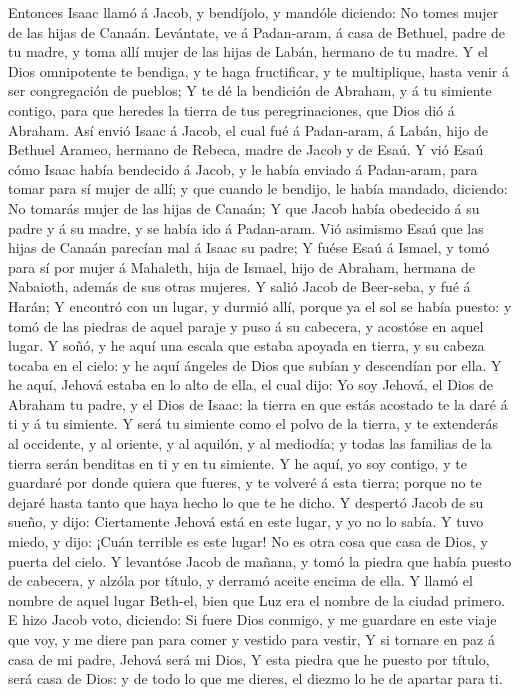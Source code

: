  Entonces Isaac llamó á Jacob, y bendíjolo, y mandóle
diciendo: No tomes mujer de las hijas de Canaán.  Levántate,
ve á Padan-aram, á casa de Bethuel, padre de tu madre, y toma allí mujer
de las hijas de Labán, hermano de tu madre.  Y el Dios
omnipotente te bendiga, y te haga fructificar, y te multiplique, hasta
venir á ser congregación de pueblos;  Y te dé la bendición
de Abraham, y á tu simiente contigo, para que heredes la tierra de tus
peregrinaciones, que Dios dió á Abraham.  Así envió Isaac á
Jacob, el cual fué á Padan-aram, á Labán, hijo de Bethuel Arameo,
hermano de Rebeca, madre de Jacob y de Esaú.  Y vió Esaú
cómo Isaac había bendecido á Jacob, y le había enviado á Padan-aram,
para tomar para sí mujer de allí; y que cuando le bendijo, le había
mandado, diciendo: No tomarás mujer de las hijas de Canaán; 
Y que Jacob había obedecido á su padre y á su madre, y se había ido á
Padan-aram.  Vió asimismo Esaú que las hijas de Canaán
parecían mal á Isaac su padre;  Y fuése Esaú á Ismael, y
tomó para sí por mujer á Mahaleth, hija de Ismael, hijo de Abraham,
hermana de Nabaioth, además de sus otras mujeres.  Y salió
Jacob de Beer-seba, y fué á Harán;  Y encontró con un
lugar, y durmió allí, porque ya el sol se había puesto: y tomó de las
piedras de aquel paraje y puso á su cabecera, y acostóse en aquel lugar.
 Y soñó, y he aquí una escala que estaba apoyada en tierra,
y su cabeza tocaba en el cielo: y he aquí ángeles de Dios que subían y
descendían por ella.  Y he aquí, Jehová estaba en lo alto
de ella, el cual dijo: Yo soy Jehová, el Dios de Abraham tu padre, y el
Dios de Isaac: la tierra en que estás acostado te la daré á ti y á tu
simiente.  Y será tu simiente como el polvo de la tierra, y
te extenderás al occidente, y al oriente, y al aquilón, y al mediodía; y
todas las familias de la tierra serán benditas en ti y en tu simiente.
 Y he aquí, yo soy contigo, y te guardaré por donde quiera
que fueres, y te volveré á esta tierra; porque no te dejaré hasta tanto
que haya hecho lo que te he dicho.  Y despertó Jacob de su
sueño, y dijo: Ciertamente Jehová está en este lugar, y yo no lo sabía.
 Y tuvo miedo, y dijo: ¡Cuán terrible es este lugar! No es
otra cosa que casa de Dios, y puerta del cielo.  Y
levantóse Jacob de mañana, y tomó la piedra que había puesto de
cabecera, y alzóla por título, y derramó aceite encima de ella.
 Y llamó el nombre de aquel lugar Beth-el, bien que Luz era
el nombre de la ciudad primero.  E hizo Jacob voto,
diciendo: Si fuere Dios conmigo, y me guardare en este viaje que voy, y
me diere pan para comer y vestido para vestir,  Y si
tornare en paz á casa de mi padre, Jehová será mi Dios,  Y
esta piedra que he puesto por título, será casa de Dios: y de todo lo
que me dieres, el diezmo lo he de apartar para ti.

